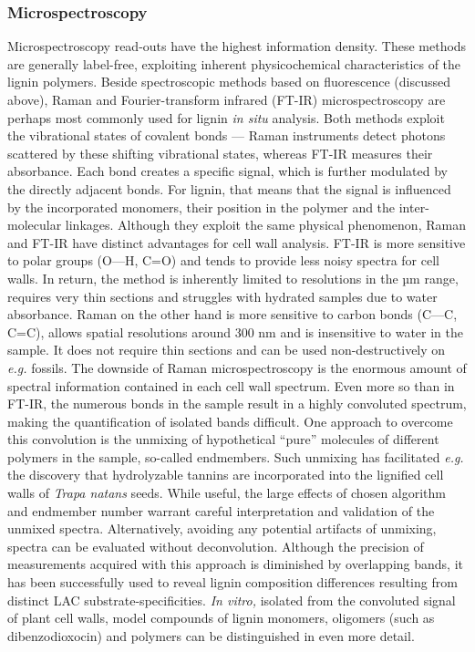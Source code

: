 \documentclass[journal=,manuscript=]{achemso}
\begin{document}
\subsubsection{Microspectroscopy}\label{microspectroscopy}

Microspectroscopy read-outs have the highest information density. These
methods are generally label-free, exploiting inherent physicochemical
characteristics of the lignin polymers. Beside spectroscopic methods
based on fluorescence (discussed above), Raman and Fourier-transform
infrared (FT-IR) microspectroscopy are perhaps most commonly used for
lignin \emph{in situ} analysis. Both methods exploit the vibrational
states of covalent bonds --- Raman instruments detect photons scattered
by these shifting vibrational states, whereas FT-IR measures their
absorbance. Each bond creates a specific signal, which is further
modulated by the directly adjacent bonds. For lignin, that means that
the signal is influenced by the incorporated monomers, their position in
the polymer and the inter-molecular linkages.\citep{Yamamoto2020a}
Although they exploit the same physical phenomenon, Raman and FT-IR have
distinct advantages for cell wall analysis. FT-IR is more sensitive to
polar groups (O---H, C=O) and tends to provide less noisy spectra for
cell walls.\citep{Guillon2022} In return, the method is inherently
limited to resolutions in the µm range, requires very thin sections and
struggles with hydrated samples due to water
absorbance.\citep{Guillon2022} Raman on the other hand is more sensitive
to carbon bonds (C---C, C=C), allows spatial resolutions around 300 nm
and is insensitive to water in the sample.\citep{Guillon2022} It does
not require thin sections and can be used non-destructively on
\emph{e.g.} fossils.\citep{Qu2019} The downside of Raman
microspectroscopy is the enormous amount of spectral information
contained in each cell wall spectrum. Even more so than in FT-IR, the
numerous bonds in the sample result in a highly convoluted spectrum,
making the quantification of isolated bands difficult. One approach to
overcome this convolution is the unmixing of hypothetical ``pure''
molecules of different polymers in the sample, so-called endmembers.
Such unmixing has facilitated \emph{e.g.} the discovery that
hydrolyzable tannins are incorporated into the lignified cell walls of
\emph{Trapa natans} seeds.\citep{Huss2024} While useful, the large
effects of chosen algorithm and endmember number warrant careful
interpretation and validation of the unmixed spectra. Alternatively,
avoiding any potential artifacts of unmixing, spectra can be evaluated
without deconvolution. Although the precision of measurements acquired
with this approach is diminished by overlapping bands, it has been
successfully used to reveal lignin composition differences resulting
from distinct LAC
substrate-specificities.\citep{Blaschek2020, Blaschek2023} \emph{In
vitro,} isolated from the convoluted signal of plant cell walls, model
compounds of lignin monomers, oligomers (such as dibenzodioxocin) and
polymers can be distinguished in even more
detail.\citep{Bock2020, Blaschek2020}
\end{document}
